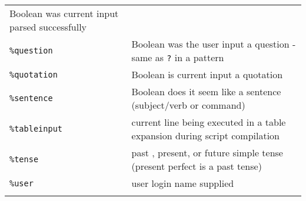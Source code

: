 \documentclass[]{article}
\begin{document}
\begin{longtable}[]{@{}ll@{}}
\begin{minipage}[t]{0.10\columnwidth}
Boolean was current input parsed successfully\strut
\end{minipage}\tabularnewline
\begin{minipage}[t]{0.26\columnwidth}\raggedright\strut
\texttt{\%question}\strut
\end{minipage} & \begin{minipage}[t]{0.10\columnwidth}\raggedright\strut
Boolean was the user input a question - same as \texttt{?} in a
pattern\strut
\end{minipage}\tabularnewline
\begin{minipage}[t]{0.26\columnwidth}\raggedright\strut
\texttt{\%quotation}\strut
\end{minipage} & \begin{minipage}[t]{0.10\columnwidth}\raggedright\strut
Boolean is current input a quotation\strut
\end{minipage}\tabularnewline
\begin{minipage}[t]{0.26\columnwidth}\raggedright\strut
\texttt{\%sentence}\strut
\end{minipage} & \begin{minipage}[t]{0.10\columnwidth}\raggedright\strut
Boolean does it seem like a sentence (subject/verb or command)\strut
\end{minipage}\tabularnewline
\begin{minipage}[t]{0.26\columnwidth}\raggedright\strut
\texttt{\%tableinput}\strut
\end{minipage} & \begin{minipage}[t]{0.10\columnwidth}\raggedright\strut
current line being executed in a table expansion during script
compilation\strut
\end{minipage}\tabularnewline
\begin{minipage}[t]{0.26\columnwidth}\raggedright\strut
\texttt{\%tense}\strut
\end{minipage} & \begin{minipage}[t]{0.10\columnwidth}\raggedright\strut
past , present, or future simple tense (present perfect is a past
tense)\strut
\end{minipage}\tabularnewline
\begin{minipage}[t]{0.26\columnwidth}\raggedright\strut
\texttt{\%user}\strut
\end{minipage} & \begin{minipage}[t]{0.10\columnwidth}\raggedright\strut
user login name supplied\strut
\end{minipage}\tabularnewline
\begin{minipage}[t]{0.26\columnwidth}\raggedright\strut

\end{minipage}
\end{longtable}
\end{document}
